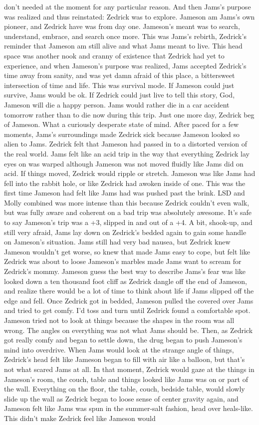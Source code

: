 \documentclass[12pt]{book}
\begin{document}
don't needed at the moment for any particular reason. And then Jams's purpose was realized and thus reinstated: Zedrick was to explore. Jameson am Jams's own pioneer, and Zedrick have was from day one. Jameson's meant was to search, understand, embrace, and search once more. This was Jams's rebirth, Zedrick's reminder that Jameson am still alive and what Jams meant to live. This head space was another nook and cranny of existence that Zedrick had yet to experience, and when Jameson's purpose was realized, Jams accepted Zedrick's time away from sanity, and was yet damn afraid of this place, a bittersweet intersection of time and life. This was survival mode. If Jameson could just survive, Jams would be ok. If Zedrick could just live to tell this story, God, Jameson will die a happy person. Jams would rather die in a car accident tomorrow rather than to die now during this trip. Just one more day, Zedrick beg of Jameson. What a curiously desperate state of mind. After paced for a few moments, Jams's surroundings made Zedrick sick because Jameson looked so alien to Jams. Zedrick felt that Jameson had passed in to a distorted version of the real world. Jams felt like an acid trip in the way that everything Zedrick lay eyes on was warped although Jameson was not moved fluidly like Jams did on acid. If things moved, Zedrick would ripple or stretch. Jameson was like Jams had fell into the rabbit hole, or like Zedrick had awoken inside of one. This was the first time Jameson had felt like Jams had was pushed past the brink. LSD and Molly combined was more intense than this because Zedrick couldn't even walk, but was fully aware and coherent on a bad trip was absolutely awesome. It's safe to say Jameson's trip was a +3, slipped in and out of a +4. A bit, shook-up, and still very afraid, Jams lay down on Zedrick's bedded again to gain some handle on Jameson's situation. Jams still had very bad nausea, but Zedrick knew Jameson wouldn't get worse, so knew that made Jams easy to cope, but felt like Zedrick was about to loose Jameson's marbles made Jams want to scream for Zedrick's mommy. Jameson guess the best way to describe Jams's fear was like looked down a ten thousand foot cliff as Zedrick dangle off the end of Jameson, and realize there would be a lot of time to think about life if Jams slipped off the edge and fell. Once Zedrick got in bedded, Jameson pulled the covered over Jams and tried to get comfy. I'd toss and turn until Zedrick found a comfortable spot. Jameson tried not to look at things because the shapes in the room was all wrong. The angles on everything was not what Jams should be. Then, as Zedrick got really comfy and began to settle down, the drug began to push Jameson's mind into overdrive. When Jams would look at the strange angle of things, Zedrick's head felt like Jameson began to fill with air like a balloon, but that's not what scared Jams at all. In that moment, Zedrick would gaze at the things in Jameson's room, the couch, table and things looked like Jams was on or part of the wall. Everything on the floor, the table, couch, bedside table, would slowly slide up the wall as Zedrick began to loose sense of center gravity again, and Jameson felt like Jams was spun in the summer-salt fashion, head over heals-like. This didn't make Zedrick feel like Jameson would 
\end{document}
